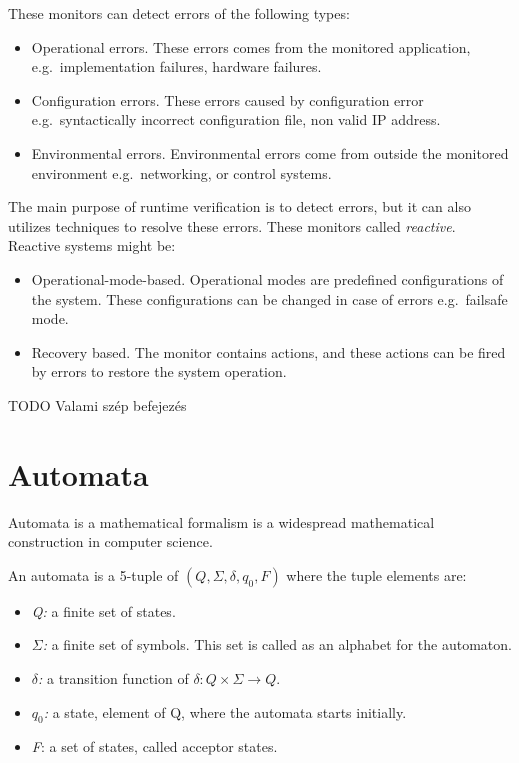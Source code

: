 These monitors can detect errors of the following types:
\begin{itemize}
	\item Operational errors. These errors comes from the monitored application, e.g.\ implementation failures, hardware failures.
	\item Configuration errors. These errors caused by configuration error e.g.\ syntactically incorrect configuration file, non valid IP address.
	\item Environmental errors. Environmental errors come from outside the monitored environment e.g.\ networking, or control systems.
\end{itemize}

The main purpose of runtime verification is to detect errors, but it can also utilizes techniques to resolve these errors. These monitors called \emph{reactive}. Reactive systems might be:
\begin{itemize}
	\item Operational-mode-based. Operational modes are predefined configurations of the system. These configurations can be changed in case of errors e.g.\ failsafe mode.
	\item Recovery based. The monitor contains actions, and these actions can be fired by errors to restore the system operation.
\end{itemize}

TODO Valami szép befejezés

\section{Automata}
\label{sec:automata}

Automata is a mathematical formalism is a widespread mathematical construction in computer science.

An automata is a 5-tuple of $(Q, \Sigma, \delta, q_0, F)$ where the tuple elements are:
\begin{itemize}
	\item \emph{Q:} a finite set of states.
	\item \emph{$\Sigma$:} a finite set of symbols. This set is called as an alphabet for the automaton.
	\item \emph{$\delta$:} a transition function of $\delta: Q \times \Sigma \rightarrow Q$.
	\item \emph{$q_0$:} a state, element of Q, where the automata starts initially.
	\item \emph{F}: a set of states, called acceptor states.
\end{itemize}

